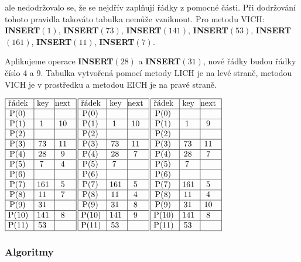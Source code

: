 \documentclass[a4paper,12pt]{article}
\begin{document}
ale nedodržovalo se, že se nejdřív zaplňují řádky z 
pomocné části.  Při dodržování tohoto pravidla takováto tabulka 
nemůže vznik\-nout.\newline 
Pro metodu VICH:\newline 
{\bf INSERT$(1)$}, {\bf INSERT$(73)$}, {\bf INSERT$(141)$}, 
{\bf INSERT$(53)$}, {\bf INSERT$(161)$},\newline 
{\bf INSERT$(11)$}, {\bf INSERT$(7)$}. 

Aplikujeme operace {\bf INSERT$(28)$} a {\bf INSERT$(31
)$}, nové řád\-ky 
budou řádky číslo 4 a 9. Tabulka vytvořená pomocí 
metody LICH je na levé straně, metodou VICH je v 
prostředku a metodou EICH je na pravé straně.

$\vbox {\hbox{\vtop{\offinterlineskip\halign{\strut\vrule\ # & \vrule\ # & \vrule\hfil # \hfil\vrule\cr\noalign{\hrule}řádek & key & next \hfil\cr\noalign{\hrule}P(0) & &\hfill \cr\noalign{\hrule}P(1) & 1 & 10 \cr\noalign{\hrule}P(2) & &\hfill \cr\noalign{\hrule}P(3) & 73 & 11 \cr\noalign{\hrule}P(4) & 28 & 9 \cr\noalign{\hrule}P(5) & 7 & 4 \cr\noalign{\hrule}P(6) &  &\hfill \cr\noalign{\hrule}P(7) & 161 & 5 \cr\noalign{\hrule}P(8) & 11 & 7 \cr\noalign{\hrule}P(9) & 31 &\hfill \cr\noalign{\hrule}\noalign{\hrule}P(10) & 141 & 8 \cr\noalign{\hrule}P(11) & 53 & \hfill \cr\noalign{\hrule}}}\,\vtop{\offinterlineskip\halign{\strut\vrule\ # & \vrule\ # & \vrule\hfil# \hfil\vrule\cr\noalign{\hrule}řádek & key & next \hfil\cr\noalign{\hrule}P(0) & &\hfill \cr\noalign{\hrule}P(1) & 1 & 10 \cr\noalign{\hrule}P(2) & &\hfill \cr\noalign{\hrule}P(3) & 73 & 11 \cr\noalign{\hrule}P(4) & 28 & 7 \cr\noalign{\hrule}P(5) & 7 & \hfill \cr\noalign{\hrule}P(6) &  &\hfill \cr\noalign{\hrule}P(7) & 161 & 5 \cr\noalign{\hrule}P(8) & 11 & 4 \cr\noalign{\hrule}P(9) & 31 & 8 \cr\noalign{\hrule}\noalign{\hrule}P(10) & 141 & 9 \cr\noalign{\hrule}P(11) & 53 & \hfill \cr\noalign{\hrule}}}\,\vtop{\offinterlineskip\halign {\strut\vrule\ # & \vrule\ # & \vrule \hfil # \hfil \vrule\cr\noalign{\hrule}řádek & key & next \hfil \cr\noalign{\hrule}P(0) & &\hfill \cr\noalign{\hrule}P(1) & 1 & 9 \cr\noalign{\hrule}P(2) & &\hfill \cr\noalign{\hrule}P(3) & 73 & 11 \cr\noalign{\hrule}P(4) & 28 & 7 \cr\noalign{\hrule}P(5) & 7 & \hfill \cr\noalign{\hrule}P(6) & & \hfill \cr\noalign{\hrule}P(7) & 161 & 5 \cr\noalign{\hrule}P(8) & 11 & 4  \cr\noalign{\hrule}P(9) & 31 & 10 \cr\noalign{\hrule}\noalign{\hrule}P(10) & 141 & 8 \cr\noalign{\hrule}P(11) & 53 & \hfill \cr\noalign{\hrule}}}}}$

\subsubsection{Algoritmy}
\end{document}
